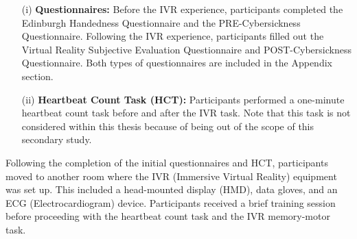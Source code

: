 \documentclass[12pt,oneside,openright]{report}
\begin{document}
\begin{enumerate}
\item[(i)] \textbf{Questionnaires:} Before the IVR experience, participants completed the Edinburgh Handedness Questionnaire and the PRE-Cybersickness Questionnaire. Following the IVR experience, participants filled out the Virtual Reality Subjective Evaluation Questionnaire and POST-Cybersickness Questionnaire. Both types of questionnaires are included in the Appendix section.

\item[(ii)] \textbf{Heartbeat Count Task (HCT):} Participants performed a one-minute heartbeat count task before and after the IVR task. Note that this task is not considered within this thesis because of being out of the scope of this secondary study.
\end{enumerate}

Following the completion of the initial questionnaires and HCT, participants moved to another room where the IVR (Immersive Virtual Reality) equipment was set up. This included a head-mounted display (HMD), data gloves, and an ECG (Electrocardiogram) device. Participants received a brief training session before proceeding with the heartbeat count task and the IVR memory-motor task.
\end{document}
